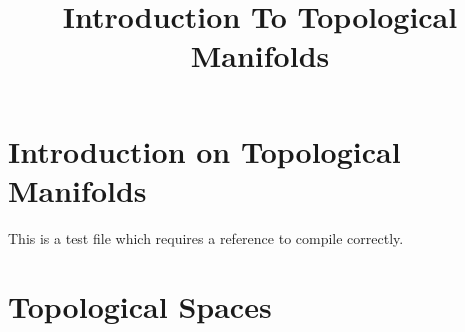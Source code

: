


%


\title{Introduction To Topological Manifolds}


\maketitle

\label{section-phantom}

\tableofcontents

\section{Introduction on Topological Manifolds}
\label{section-introduction}

This is a test file which requires a reference to compile correctly. \cite{Maclane}

\section{Topological Spaces}
\label{section-topological-spaces}

